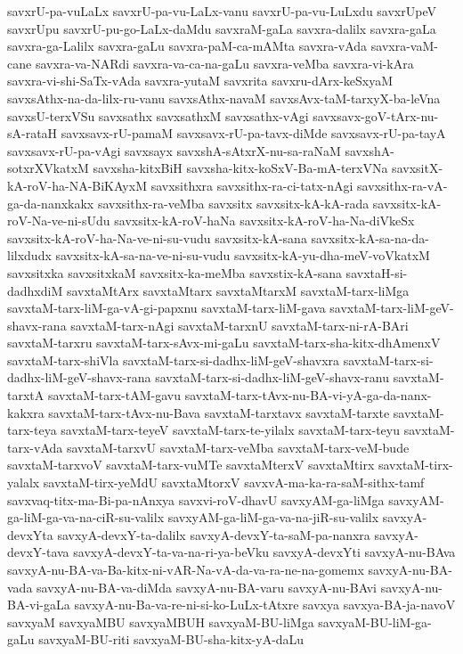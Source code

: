{savxrU-pa-vuLaLx
savxrU-pa-vu-LaLx-vanu
savxrU-pa-vu-LuLxdu
savxrUpeV
savxrUpu
savxrU-pu-go-LaLx-daMdu
savxraM-gaLa
savxra-dalilx
savxra-gaLa
savxra-ga-Lalilx
savxra-gaLu
savxra-paM-ca-mAMta
savxra-vAda
savxra-vaM-cane
savxra-va-NARdi
savxra-va-ca-na-gaLu
savxra-veMba
savxra-vi-kAra
savxra-vi-shi-SaTx-vAda
savxra-yutaM
savxrita
savxru-dArx-keSxyaM
savxsAthx-na-da-lilx-ru-vanu
savxsAthx-navaM
savxsAvx-taM-tarxyX-ba-leVna
savxsU-terxVSu
savxsathx
savxsathxM
savxsathx-vAgi
savxsavx-goV-tArx-nu-sA-rataH
savxsavx-rU-pamaM
savxsavx-rU-pa-tavx-diMde
savxsavx-rU-pa-tayA
savxsavx-rU-pa-vAgi
savxsayx
savxshA-sAtxrX-nu-sa-raNaM
savxshA-sotxrXVkatxM
savxsha-kitxBiH
savxsha-kitx-koSxV-Ba-mA-terxVNa
savxsitX-kA-roV-ha-NA-BiKAyxM
savxsithxra
savxsithx-ra-ci-tatx-nAgi
savxsithx-ra-vA-ga-da-nanxkakx
savxsithx-ra-veMba
savxsitx
savxsitx-kA-kA-rada
savxsitx-kA-roV-Na-ve-ni-sUdu
savxsitx-kA-roV-haNa
savxsitx-kA-roV-ha-Na-diVkeSx
savxsitx-kA-roV-ha-Na-ve-ni-su-vudu
savxsitx-kA-sana
savxsitx-kA-sa-na-da-lilxdudx
savxsitx-kA-sa-na-ve-ni-su-vudu
savxsitx-kA-yu-dha-meV-voVkatxM
savxsitxka
savxsitxkaM
savxsitx-ka-meMba
savxstix-kA-sana
savxtaH-si-dadhxdiM
savxtaMtArx
savxtaMtarx
savxtaMtarxM
savxtaM-tarx-liMga
savxtaM-tarx-liM-ga-vA-gi-papxnu
savxtaM-tarx-liM-gava
savxtaM-tarx-liM-geV-shavx-rana
savxtaM-tarx-nAgi
savxtaM-tarxnU
savxtaM-tarx-ni-rA-BAri
savxtaM-tarxru
savxtaM-tarx-sAvx-mi-gaLu
savxtaM-tarx-sha-kitx-dhAmenxV
savxtaM-tarx-shiVla
savxtaM-tarx-si-dadhx-liM-geV-shavxra
savxtaM-tarx-si-dadhx-liM-geV-shavx-rana
savxtaM-tarx-si-dadhx-liM-geV-shavx-ranu
savxtaM-tarxtA
savxtaM-tarx-tAM-gavu
savxtaM-tarx-tAvx-nu-BA-vi-yA-ga-da-nanx-kakxra
savxtaM-tarx-tAvx-nu-Bava
savxtaM-tarxtavx
savxtaM-tarxte
savxtaM-tarx-teya
savxtaM-tarx-teyeV
savxtaM-tarx-te-yilalx
savxtaM-tarx-teyu
savxtaM-tarx-vAda
savxtaM-tarxvU
savxtaM-tarx-veMba
savxtaM-tarx-veM-bude
savxtaM-tarxvoV
savxtaM-tarx-vuMTe
savxtaMterxV
savxtaMtirx
savxtaM-tirx-yalalx
savxtaM-tirx-yeMdU
savxtaMtorxV
savxvA-ma-ka-ra-saM-sithx-tamf
savxvaq-titx-ma-Bi-pa-nAnxya
savxvi-roV-dhavU
savxyAM-ga-liMga
savxyAM-ga-liM-ga-va-na-ciR-su-valilx
savxyAM-ga-liM-ga-va-na-jiR-su-valilx
savxyA-devxYta
savxyA-devxY-ta-dalilx
savxyA-devxY-ta-saM-pa-nanxra
savxyA-devxY-tava
savxyA-devxY-ta-va-na-ri-ya-beVku
savxyA-devxYti
savxyA-nu-BAva
savxyA-nu-BA-va-Ba-kitx-ni-vAR-Na-vA-da-va-ra-ne-na-gomemx
savxyA-nu-BA-vada
savxyA-nu-BA-va-diMda
savxyA-nu-BA-varu
savxyA-nu-BAvi
savxyA-nu-BA-vi-gaLa
savxyA-nu-Ba-va-re-ni-si-ko-LuLx-tAtxre
savxya
savxya-BA-ja-navoV
savxyaM
savxyaMBU
savxyaMBUH
savxyaM-BU-liMga
savxyaM-BU-liM-ga-gaLu
savxyaM-BU-riti
savxyaM-BU-sha-kitx-yA-daLu
}
